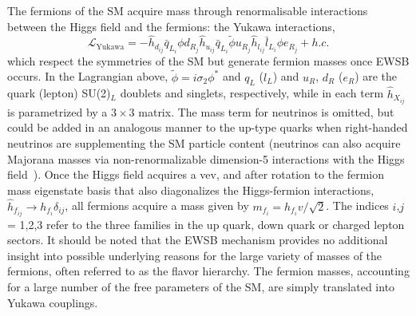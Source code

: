 The fermions of the SM acquire mass through renormalisable interactions between the Higgs field and the fermions: the Yukawa interactions,
\begin{equation}
    \mathcal{L}_\text{Yukawa} = -\hat{h}_{d_{ij}} \bar{q}_{L_i}\phi d_{R_j} \hat{h}_{u_{ij}} \bar{q}_{L_i}\tilde{\phi} u_{R_j} \hat{h}_{l_{ij}} \bar{l}_{L_i}\phi e_{R_j} + h.c.
\end{equation}
which respect the symmetries of the SM but generate fermion masses once EWSB occurs.
In the Lagrangian above, $\tilde{\phi} = i\sigma_2\phi^*$ and $q_L$ ($l_L$) and $u_R$, $d_R$ ($e_R$) are the quark (lepton) SU(2)$_L$ doublets and singlets, respectively, while in each term $\hat{h}_{X_{ij}}$ is parametrized by a $3\times3$ matrix.
The mass term for neutrinos is omitted, but could be added in an analogous manner to the up-type quarks when right-handed neutrinos are supplementing the SM particle content (neutrinos can also acquire Majorana masses via non-renormalizable dimension-5 interactions with the Higgs field~\cite{Weinberg:1979sa}).
Once the Higgs field acquires a vev, and after rotation to the fermion mass eigenstate basis that also diagonalizes the Higgs-fermion interactions, $\hat{h}_{f_{ij}} \rightarrow h_{f_i} \delta_{ij}$, all fermions acquire a mass given by $m_{f_i} = h_{f_{i}} v/\sqrt{2}$.
The indices $i$,$j$ = 1,2,3 refer to the three families in the up quark, down quark or charged lepton sectors.
It should be noted that the EWSB mechanism provides no additional insight into possible underlying reasons for the large variety of masses of the fermions, often referred to as the flavor hierarchy.
The fermion masses, accounting for a large number of the free parameters of the SM, are simply translated into Yukawa couplings.

